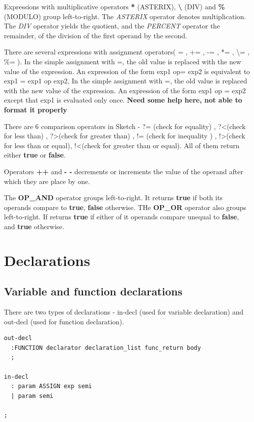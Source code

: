 \documentclass{l3proj}
\begin{document}
Expressions with multiplicative operators \textbf{*} (ASTERIX), \textbf{\textbackslash } (DIV) and \textbf{\%} (MODULO)  group left-to-right. The \textit{ASTERIX} operator denotes multiplication. The  \textit{DIV} operator yields the quotient, and the \textit{PERCENT} operator the remainder, of the division of the first operand by the second.

There are several expressions with assignment operators( = , += , -= , *= , \textbackslash= , \%= ). In the simple assignment with =, the old value is replaced with the new value of the expression.   An expression of the form exp1 op= exp2 is equivalent to exp1 = exp1 op exp2, In the simple assignment with =, the old value is replaced with the new value of the expression.  An expression of the form exp1 op = exp2 except that exp1 is evaluated only once. \textbf{Need some help here, not able to format it properly}

There are 6 comparison operators in Sketch - ?= (check for equality) , ?\textless (check for less than) , ?\textgreater (check for greater than) , != (check for inequality ) , !\textgreater(check for less than or equal), !\textless (check for greater than or equal). All of them return either \textbf{true} or \textbf{false}. 

Operators \textbf{++} and \textbf{- -} decrements or increments the value of the operand after which they are place by one.

The \textbf{OP\_AND} operator groups left-to-right. It returns \textbf{true}  if both its operands compare to \textbf{true}, \textbf{false} otherwise. THe \textbf{OP\_OR} operator also groups left-to-right. If returns \textbf{true} if either of it operands compare unequal to \textbf{false}, and \textbf{true} otherwise. 


\section {Declarations}
\subsection{Variable and function declarations}
There are two types of declarations - in-decl (used for variable declaration) and out-decl (used for function declaration).
\begin{lstlisting}
out-decl
  :FUNCTION declarator declaration_list func_return body 
  ;

in-decl 
  : param ASSIGN exp semi
  | param semi 
    
;
\end{lstlisting}
\end{document}
